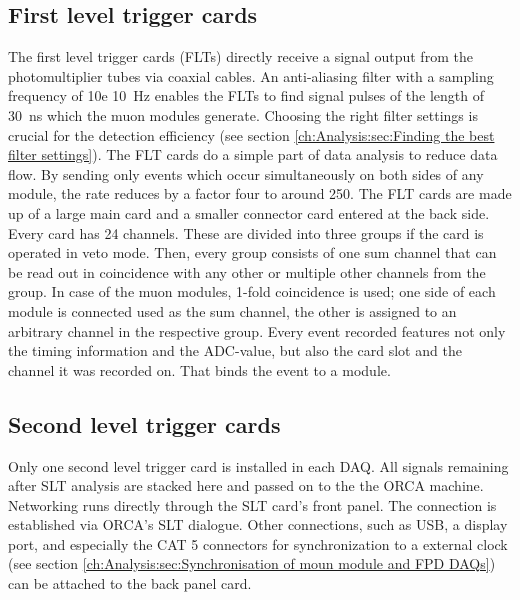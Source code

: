   \subsection{First level trigger cards}
  \label{ch:The muon detection system: sec: DAQ:subsec:FLTs}
  The first level trigger cards (FLTs) directly receive a signal output from the photomultiplier tubes via coaxial cables. An anti-aliasing filter with a sampling frequency of \SI{10e 10}{\hertz} enables the FLTs to find signal pulses of the length of \SI{30}{\nano\second} which the muon modules generate. Choosing the right filter settings is crucial for the detection efficiency (see section \ref{ch:Analysis:sec:Finding the best filter settings}). The FLT cards do a simple part of data analysis to reduce data flow. By sending only events which occur simultaneously on both sides of any module, the rate reduces by a factor four to around \SI{250}{\cps}. The FLT cards are made up of a large main card and a smaller connector card entered at the back side. Every card has 24 channels. These are divided into three groups if the card is operated in veto mode. Then, every group consists of one sum channel that can be read out in coincidence with any other or multiple other channels from the group. In case of the muon modules, 1-fold coincidence is used; one side of each module is connected used as the sum channel, the other is assigned to an arbitrary channel in the respective group. Every event recorded features not only the timing information and the ADC-value, but also the card slot and the channel it was recorded on. That binds the event to a module.
  
  \subsection{Second level trigger cards}
  \label{ch:The muon detection system: sec: DAQ:subsec:SLTs}
  Only one second level trigger card is installed in each DAQ. All signals remaining after SLT analysis are stacked here and passed on to the the ORCA machine. Networking runs directly through the SLT card's front panel. The connection is established via ORCA's SLT dialogue. Other connections, such as USB, a display port, and especially the CAT 5 connectors for synchronization to a external clock (see section \ref{ch:Analysis:sec:Synchronisation of moun module and FPD DAQs}) can be attached to the back panel card. 

